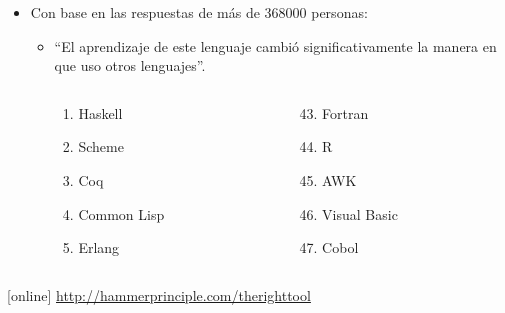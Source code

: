 \documentclass[spanish]{beamer}
\begin{document}
\begin{frame}
  \begin{itemize}
  \item
    Con base en las respuestas de más de 368000 personas:
    \begin{itemize}
    \item
      ``El aprendizaje de este lenguaje cambió significativamente la
      manera en que uso otros lenguajes''.
      \begin{columns}[T]
        \begin{column}{3cm}
          \begin{enumerate}
          \item Haskell
          \item Scheme
          \item Coq
          \item Common Lisp
          \item Erlang
          \end{enumerate}
        \end{column}
        \begin{column}{3cm}
          \begin{enumerate}
          \setcounter{enumi}{42}
          \item Fortran
          \item R
          \item AWK
          \item Visual Basic
          \item Cobol
          \end{enumerate}
        \end{column}
      \end{columns}
    \end{itemize}
  \end{itemize}
  \begin{thebibliography}{}
  [online]
    \newblock \url{http://hammerprinciple.com/therighttool}
  \end{thebibliography}
\end{frame}

\end{document}
